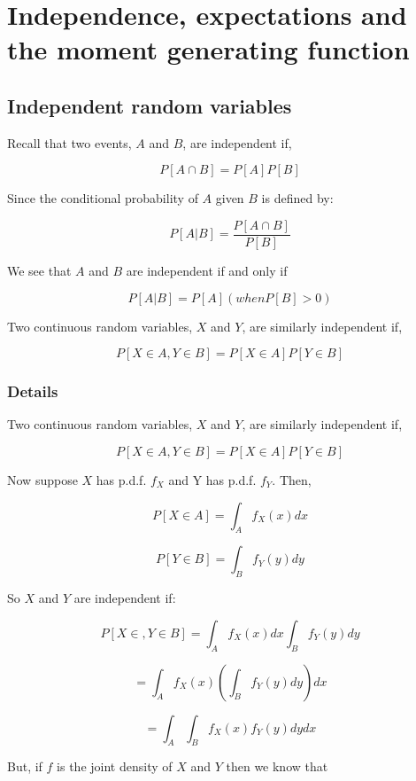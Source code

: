 \documentclass[12pt,a4paper]{article}
\theoremstyle{regla}
\theoremstyle{remark}
\theoremstyle{definition}
\theoremstyle{nonumberbreak}
\begin{document}
\section{Independence, expectations and the moment generating function}
\subsection{Independent random variables}
\begin{fbox}
\begin{minipage}{0.97\textwidth}
Recall that two events, $A$ and $B$, are independent if,

$$ P [A \cap B] = P[A] P[B] $$

Since the conditional probability of $A$ given $B$ is defined by:

$$ P [A|B] = \frac {P [A \cap B]} {P[B]}$$

We see that $A$ and $B$ are independent if and only if

$$ P[A|B] = P[A](when  P [B] > 0 )$$

 

Two continuous random variables, $X$ and $Y$, are similarly independent if,

$$ P [X \in A, Y \in B] = P [X \in A] P[Y \in B] $$

\end{minipage}
\end{fbox}
\subsubsection{Details}
Two continuous random variables, $X$ and $Y$, are similarly independent if,

$$ P [X \in A, Y \in B] = P [X \in A] P[Y \in B] $$

Now suppose $X$ has p.d.f. $f_X$  and Y has p.d.f. $f_Y$. Then,

$$ P [X \in A] = \int_{A} f_X (x) dx $$

$$ P [Y \in B] = \int_{B} f_Y (y) dy $$

So $X$ and $Y$ are independent if:

$$ P [X \in , Y \in B] = \int_{A} f_X (x) dx \int_{B} f_Y (y) dy $$

$$ = \int_{A}f_X (x) (\int_{B} f_Y (y) dy) dx$$

$$ = \int_{A}\int_{B} f_X (x)f_Y (y) dydx $$

But, if $f$ is the joint density of $X$ and $Y$ then we know that
\end{document}
